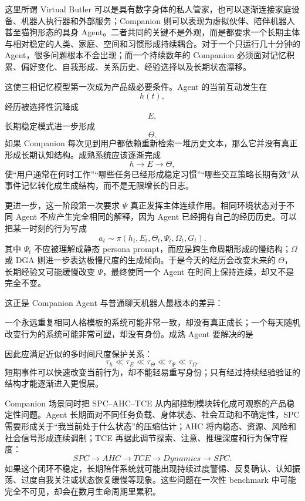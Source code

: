 这里所谓 Virtual Butler 可以是具有数字身体的私人管家，也可以逐渐连接家庭设备、机器人执行器和外部服务；Companion 则可以表现为虚拟伙伴、陪伴机器人甚至猫狗形态的具身 Agent。二者共同的关键不是外观，而是都要求一个长期主体与相对稳定的人类、家庭、空间和习惯形成持续耦合。对于一个只运行几十分钟的 Agent，很多问题根本不会出现；而一个持续数年的 Companion 必须面对记忆积累、偏好变化、自我形成、关系历史、经验选择以及长期状态漂移。

这使三相记忆模型第一次成为产品级必要条件。Agent 的当前互动发生在
\[
h(t),
\]
经历被选择性沉降成
\[
E,
\]
长期稳定模式进一步形成
\[
\Theta.
\]
如果 Companion 每次见到用户都依赖重新检索一堆历史文本，那么它并没有真正形成长期认知结构。成熟系统应该逐渐完成
\[
h
\rightarrow
E
\rightarrow
\Theta,
\]
使“用户通常在何时工作”“哪些任务已经形成稳定习惯”“哪些交互策略长期有效”从事件记忆转化成生成结构，而不是无限增长的日志。

更进一步，这一阶段第一次要求 $\Psi$ 真正发挥主体连续作用。相同环境状态对于不同 Agent 不应产生完全相同的解释，因为 Agent 已经拥有自己的经历历史。可以把某一时刻的行为写成
\[
a_t
\sim
\pi(
h_t,
E_t,
\Theta_t,
\Psi_t,
\Omega_t,
G_t
).
\]
其中 $\Psi_t$ 不应被理解成静态 persona prompt，而应是跨生命周期形成的慢结构；$\Omega$ 或 DGA 则进一步表达极慢尺度的生成倾向。于是今天的经历会改变未来的 $\Theta$，长期经验又可能缓慢改变 $\Psi$，最终使同一个 Agent 在时间上保持连续，却又不是完全不变。

这正是 Companion Agent 与普通聊天机器人最根本的差异：
\begin{statementbox}
\centering
{}
\end{statementbox}
一个永远重复相同人格模板的系统可能非常一致，却没有真正成长；一个每天随机改变行为的系统可能非常可塑，却没有身份。成熟 Agent 要解决的是
\begin{statementbox}
\centering
{}
\end{statementbox}
因此应满足近似的多时间尺度保护关系：
\[
\tau_h
\ll
\tau_E
\ll
\tau_\Theta
\ll
\tau_\Psi
\ll
\tau_\Omega.
\]
短期事件可以快速改变当前行为，却不能轻易重写身份；只有经过持续经验验证的结构才能逐渐进入更慢层。

Companion 场景同时把 SPC--AHC--TCE 从内部控制模块转化成可观察的产品稳定性问题。Agent 长期面对不同任务负载、身体状态、社会互动和不确定性，SPC 需要形成关于“我当前处于什么状态”的压缩估计；AHC 将内稳态、资源、风险和社会信号形成连续调制；TCE 再据此调节探索、注意、推理深度和行为保守程度：
\[
SPC
\rightarrow
AHC
\rightarrow
TCE
\rightarrow
Dynamics
\rightarrow
SPC.
\]
如果这个闭环不稳定，长期陪伴系统就可能出现持续过度警惕、反复确认、认知振荡、过度自我关注或状态恢复缓慢等现象。这些问题在一次性 benchmark 中可能完全不可见，却会在数月生命周期里累积。

